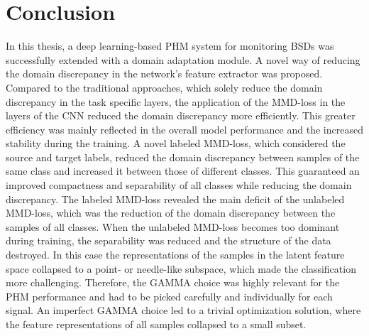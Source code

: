 \chapter{Conclusion}\label{chapter:conclusion}
In this thesis, a deep learning-based PHM system for monitoring BSDs was successfully extended with a domain adaptation module. A novel way of reducing the domain discrepancy in the network's feature extractor was proposed. Compared to the traditional approaches, which solely reduce the domain discrepancy in the task specific layers, the application of the MMD-loss in the layers of the CNN reduced the domain discrepancy more efficiently. This greater efficiency was mainly reflected in the overall model performance and the increased stability during the training. A novel labeled MMD-loss, which considered the source and target labels, reduced the domain discrepancy between samples of the same class and increased it between those of different classes. This guaranteed an improved compactness and separability of all classes while reducing the domain discrepancy. The labeled MMD-loss revealed the main deficit of the unlabeled MMD-loss, which was the reduction of the domain discrepancy between the samples of all classes. When the unlabeled MMD-loss becomes too dominant during training, the separability was reduced and the structure of the data destroyed. In this case the representations of the samples in the latent feature space collapsed to a point- or needle-like subspace, which made the classification more challenging. Therefore, the GAMMA choice was highly relevant for the PHM performance and had to be picked carefully and individually for each signal. An imperfect GAMMA choice led to a trivial optimization solution, where the feature representations of all samples collapsed to a small subset.



